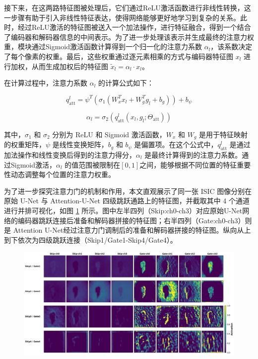 接下来，在这两路特征图被处理后，它们通过ReLU激活函数进行非线性转换，这一步骤有助于引入非线性特征表达，使得网络能够更好地学习到复杂的关系。此时，经过ReLU激活的特征图被送入一个加法操作，进行特征融合，得到一个结合了编码器和解码器信息的中间表示。为了进一步处理该表示并生成最终的注意力权重，模块通过Sigmoid激活函数计算得到一个归一化的注意力系数 $\alpha_l$，该系数决定了每个像素的权重。最后，这些权重通过逐元素相乘的方式与编码器特征图 $x_l$ 进行加权，从而生成加权后的特征图 $\tilde{x}_l = \alpha_l \cdot x_l$。

在计算过程中，注意力系数 $\alpha_l$ 的计算公式如下：

\begin{equation}
    q_{\text{att}}^l = \psi^T \left( \sigma_1 (W_x^T x_l + W_g^T g_l + b_g) \right) + b_\psi
\end{equation}

\begin{equation}
    \alpha_l = \sigma_2 \left( q_{\text{att}}^l(x_l, g_l; \Theta_{\text{att}}) \right)
\end{equation}

其中，$\sigma_1$ 和 $\sigma_2$ 分别为 ReLU 和 Sigmoid 激活函数，$W_x$ 和 $W_g$ 是用于特征映射的权重矩阵，$\psi$ 是线性变换矩阵，$b_g$ 和 $b_\psi$ 是偏置项。在这个公式中，$q_{\text{att}}^l$ 是通过加法操作和线性变换后得到的注意力得分，$\alpha_l$ 是最终计算得到的注意力系数。通过Sigmoid激活，$\alpha_l$ 的值范围被限制在$[0, 1]$之间，能够根据不同位置的特征重要性动态调整每个位置的注意力权重。

为了进一步探究注意力门的机制和作用，本文直观展示了同一张 ISIC 图像分别在原始 U-Net 与 Attention-U-Net 四级跳跃通路上的特征图，并截取其中 4 个通道进行并排可视化，如图 \ref{fig:skip_vs_gate_vis} 所示。图中左半四列（Skip:ch0-ch3）对应原始U-Net网络的编码器跳跃连接后准备和解码器拼接的特征图；右半四列（Gate:ch0-ch3）则是 Attention U-Net经过注意力门调制后的准备和解码器拼接的特征图。纵向从上到下依次为四级跳跃连接（Skip1/Gate1-Skip4/Gate4）。

\begin{figure}
    \centering
    \includegraphics[width=\textwidth]{fig/unet_vs_attunet_feature_compare.png}
    \caption{}
    \label{fig:skip_vs_gate_vis}
\end{figure}

